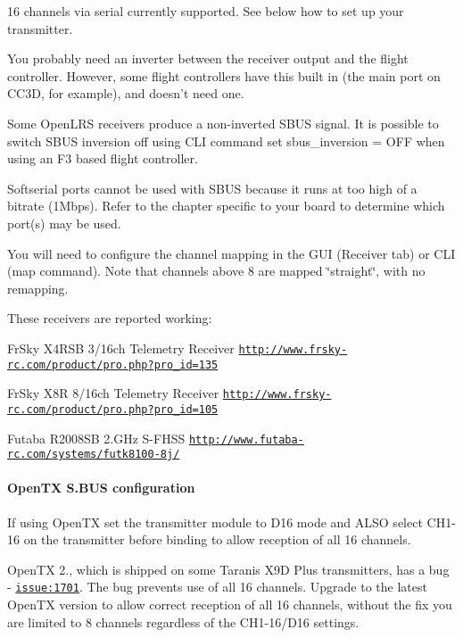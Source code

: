 16 channels via serial currently supported. See below how to set up your transmitter.


\begin{DoxyItemize}
\item You probably need an inverter between the receiver output and the flight controller. However, some flight controllers have this built in (the main port on C\+C3\+D, for example), and doesn't need one.
\item Some Open\+L\+R\+S receivers produce a non-\/inverted S\+B\+U\+S signal. It is possible to switch S\+B\+U\+S inversion off using C\+L\+I command {\ttfamily set sbus\+\_\+inversion = O\+F\+F} when using an F3 based flight controller.
\item Softserial ports cannot be used with S\+B\+U\+S because it runs at too high of a bitrate (1\+Mbps). Refer to the chapter specific to your board to determine which port(s) may be used.
\item You will need to configure the channel mapping in the G\+U\+I (Receiver tab) or C\+L\+I ({\ttfamily map} command). Note that channels above 8 are mapped \char`\"{}straight\char`\"{}, with no remapping.
\end{DoxyItemize}

These receivers are reported working\+:

Fr\+Sky X4\+R\+S\+B 3/16ch Telemetry Receiver \href{http://www.frsky-rc.com/product/pro.php?pro_id=135}{\tt http\+://www.\+frsky-\/rc.\+com/product/pro.\+php?pro\+\_\+id=135}

Fr\+Sky X8\+R 8/16ch Telemetry Receiver \href{http://www.frsky-rc.com/product/pro.php?pro_id=105}{\tt http\+://www.\+frsky-\/rc.\+com/product/pro.\+php?pro\+\_\+id=105}

Futaba R2008\+S\+B 2.\+G\+Hz S-\/\+F\+H\+S\+S \href{http://www.futaba-rc.com/systems/futk8100-8j/}{\tt http\+://www.\+futaba-\/rc.\+com/systems/futk8100-\/8j/}

\paragraph*{Open\+T\+X S.\+B\+U\+S configuration}

If using Open\+T\+X set the transmitter module to D16 mode and A\+L\+S\+O select C\+H1-\/16 on the transmitter before binding to allow reception of all 16 channels.

Open\+T\+X 2., which is shipped on some Taranis X9\+D Plus transmitters, has a bug -\/ \href{https://github.com/opentx/opentx/issues/1701}{\tt issue\+:1701}. The bug prevents use of all 16 channels. Upgrade to the latest Open\+T\+X version to allow correct reception of all 16 channels, without the fix you are limited to 8 channels regardless of the C\+H1-\/16/\+D16 settings.

